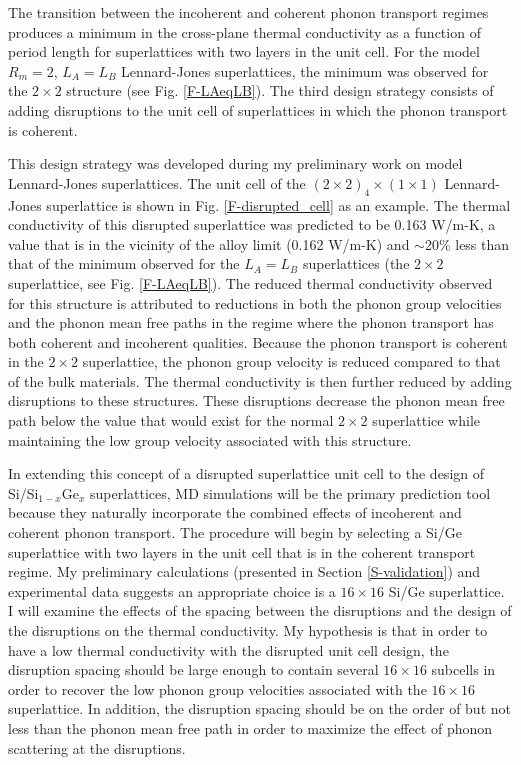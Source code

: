 \documentclass[letterpaper,12pt]{article}
\begin{document}
The transition between the incoherent and coherent phonon transport
regimes produces a minimum in the cross-plane thermal conductivity
as a function of period length for superlattices with two layers in
the unit
cell.\cite{chakraborty2003,venkata2000,caylor2005,simkin2000,chen2005,daly2002,landry2008a}
For the model $R_m = 2$, $L_A = L_B$ Lennard-Jones superlattices,
the minimum was observed for the $2\times2$ structure (see Fig.
\ref{F-LAeqLB}). The third design strategy consists of adding
disruptions to the unit cell of superlattices in which the phonon
transport is coherent.

This design strategy was developed during my preliminary work on
model Lennard-Jones superlattices.\cite{landry2008a} The unit cell
of the $(2\times2)_4\times(1\times1)$ Lennard-Jones superlattice is
shown in Fig. \ref{F-disrupted_cell} as an example. The thermal
conductivity of this disrupted superlattice was predicted to be
0.163 W/m-K, a value that is in the vicinity of the alloy limit
(0.162 W/m-K) and $\sim$20\% less than that of the minimum observed
for the $L_A = L_B$ superlattices (the $2\times2$ superlattice, see
Fig. \ref{F-LAeqLB}). The reduced thermal conductivity observed for
this structure is attributed to reductions in both the phonon group
velocities and the phonon mean free paths in the regime where the
phonon transport has both coherent and incoherent qualities. Because
the phonon transport is coherent in the $2\times2$ superlattice, the
phonon group velocity is reduced compared to that of the bulk
materials.\cite{kiselev2000,tamura1999,yang2001,bies2000,broido2004}
The thermal conductivity is then further reduced by adding
disruptions to these structures. These disruptions decrease the
phonon mean free path below the value that would exist for the
normal $2\times2$ superlattice while maintaining the low group
velocity associated with this structure.

In extending this concept of a disrupted superlattice unit cell to
the design of Si/Si$_{1-x}$Ge$_x$ superlattices, MD simulations will
be the primary prediction tool because they naturally incorporate
the combined effects of incoherent and coherent phonon transport.
The procedure will begin by selecting a Si/Ge superlattice with two
layers in the unit cell that is in the coherent transport regime. My
preliminary calculations (presented in Section \ref{S-validation})
and experimental data suggests an appropriate choice is a
$16\times16$ Si/Ge superlattice. I will examine the effects of the
spacing between the disruptions and the design of the disruptions on
the thermal conductivity. My hypothesis is that in order to have a
low thermal conductivity with the disrupted unit cell design, the
disruption spacing should be large enough to contain several
$16\times16$ subcells in order to recover the low phonon group
velocities associated with the $16\times16$ superlattice. In
addition, the disruption spacing should be on the order of but not
less than the phonon mean free path in order to maximize the effect
of phonon scattering at the disruptions.
\end{document}
